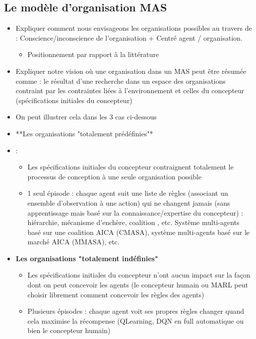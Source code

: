 \subsection{Le modèle d'organisation MAS}
\begin{itemize}

    \item Expliquer comment nous envisageons les organisations possibles au travers de : Conscience/inconscience de l'organisation + Centré agent / organisation.
          \begin{itemize}
              \item Positionnement par rapport à la littérature
          \end{itemize}
    \item Expliquer notre vision où une organisation dans un MAS peut être résumée comme : le résultat d'une recherche dans un espace des organisations contraint par les contraintes liées à l'environnement et celles du concepteur (spécifications initiales du concepteur)
    \item On peut illustrer cela dans les 3 cas ci-dessous
    \item **Les organisations "totalement prédéfinies"*\item :
          \begin{itemize}
              \item Les spécifications initiales du concepteur contraignent totalement le processus de conception à une seule organisation possible
              \item 1 seul épisode : chaque agent suit une liste de règles (associant un ensemble d'observation à une action) qui ne changent jamais (sans apprentissage mais basé sur la connaissance/expertise du concepteur) : hiérarchie, mécanisme d'enchère, coalition , etc.
                    Système multi-agents basé sur une coalition AICA (CMASA), système multi-agents basé sur le marché AICA (MMASA), etc.
          \end{itemize}
    \item \textbf{Les organisations "totalement indéfinies"}
          \begin{itemize}
              \item Les spécifications initiales du concepteur n'ont aucun impact sur la façon dont on peut concevoir les agents (le concepteur humain ou MARL peut choisir librement comment concevoir les règles des agents)
              \item Plusieurs épisodes : chaque agent voit ses propres règles changer quand cela maximise la récompense (QLearning, DQN en full automatique ou bien le concepteur humain)

\end{itemize}
\end{itemize}
